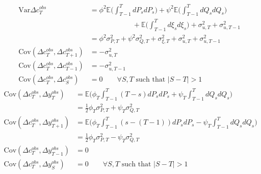 \begin{align}
\mathrm{Var}{\Delta c^{obs}_T} &= \phi^2 \mathbb{E}\Big( \int_{T-1}^{T} dP_s dP_s \Big) + \psi^2 \mathbb{E}\Big( \int_{T-1}^{T} dQ_s dQ_s \Big) \\
& \qquad \qquad \qquad+ \mathbb{E} \Big( \int_{T-1}^{T} d\xi_s d\xi_s \Big) +  \sigma^2_{u,T} +  \sigma^2_{u,T-1} \nonumber \\
&= \phi^2 \sigma^2_{P,T} + \psi^2 \sigma^2_{Q,T} + \sigma^2_{\xi,T}+\sigma^2_{u,T}+   \sigma^2_{u,T-1}  \\
\mathrm{Cov}(\Delta c^{obs}_T, \Delta c_{T+1}^{obs}) &= -\sigma^2_{u,T} \\
\mathrm{Cov}(\Delta c^{obs}_T, \Delta c_{T-1}^{obs}) &= -\sigma^2_{u,T-1} \\
\mathrm{Cov}(\Delta c^{obs}_T, \Delta c_S^{obs}) &= 0 \qquad \forall S,T \text{ such that }|S-T| >1 
\end{align}
\begin{align}
\mathrm{Cov}(\Delta c^{obs}_T, \Delta y^{obs}_T) &=  \mathbb{E} \Big( \phi_T \int_{T-1}^{T} (T-s) dP_s dP_s + \psi_T \int_{T-1}^{T} dQ_s dQ_s \Big) \nonumber \\
&= \frac{1}{2} \phi_T \sigma^2_{P,T} + \psi_T \sigma^2_{Q,T} \\
\mathrm{Cov}(\Delta c^{obs}_T, \Delta y^{obs}_{T+1}) &=  \mathbb{E} \Big( \phi_T \int_{T-1}^{T} (s-(T-1)) dP_s dP_s - \psi_T \int_{T-1}^{T} dQ_s dQ_s \Big) \nonumber \\
&= \frac{1}{2} \phi_T \sigma^2_{P,T} - \psi_T \sigma^2_{Q,T} \\
\mathrm{Cov}(\Delta c^{obs}_T, \Delta y^{obs}_{T-1}) &= 0 \\
\mathrm{Cov}(\Delta c^{obs}_T, \Delta y^{obs}_{S}) &= 0 \qquad \forall S,T \text{ such that }|S-T| >1 
\end{align}